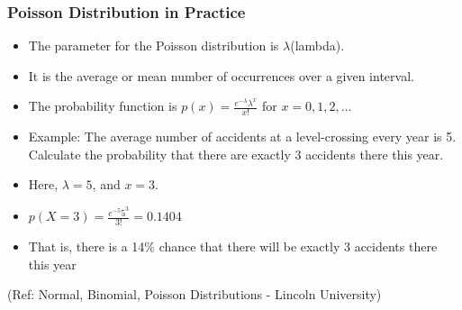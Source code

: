 \begin{frame}
\frametitle{Poisson Distribution in Practice}
\begin{itemize}
\item The parameter for the Poisson distribution is $\lambda$(lambda). 
\item It is the average or mean
number of occurrences over a given interval.
\item The probability function is $p(x) = \frac{e^{-\lambda}\lambda^x}{x!}$ for $x=0,1,2,\ldots$
\item Example: The average number of accidents at a level-crossing every year
is 5. Calculate the probability that there are exactly 3 accidents
there this year.
\item Here, $\lambda = 5$, and $x = 3$.
\item $p(X=3) = \frac{e^{-5}5^3}{3!} = 0.1404$
\item That is, there is a 14\% chance that there will be exactly 3 accidents there this year
\end{itemize}


{\tiny (Ref: Normal, Binomial, Poisson Distributions -  Lincoln University)}
\end{frame}